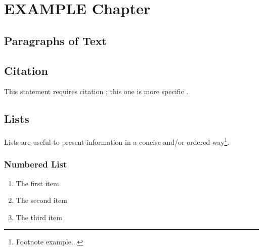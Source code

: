 \documentclass[11pt,fleqn]{book} %
\begin{document}
\listoftodos




\chapter{EXAMPLE Chapter}

\section{Paragraphs of Text}

\lipsum[1-7] %


\section{Citation}

This statement requires citation \cite{book_key}; this one is more specific \cite[122]{article_key}.


\section{Lists}

Lists are useful to present information in a concise and/or ordered way\footnote{Footnote example...}.

\subsection{Numbered List}

\begin{enumerate}
\item The first item
\item The second item
\item The third item
\end{enumerate}
\end{document}
